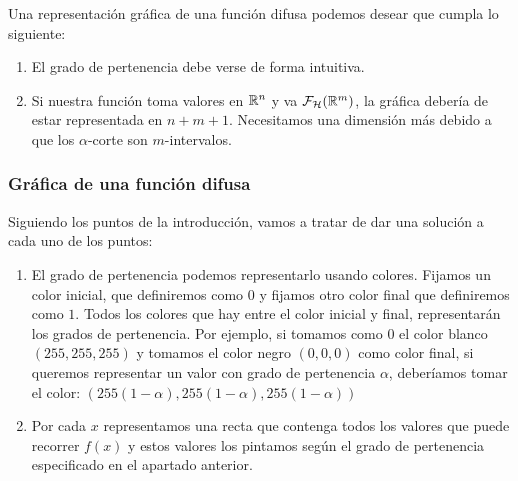   Una representación gráfica de una función difusa podemos desear que cumpla lo siguiente:
  \begin{enumerate}
  \item El grado de pertenencia debe verse de forma intuitiva.
  \item Si nuestra función toma valores en $\mathbb R^n$ y va $\mathcal{F}_\mathcal{H}(\mathbb R^m)$, la gráfica debería de estar representada en $n+m+1$. Necesitamos una dimensión más debido a que los $\alpha$-corte son $m$-intervalos.
  \end{enumerate}

  \subsubsection{Gráfica de una función difusa}

  Siguiendo los puntos de la introducción, vamos a tratar de dar una solución a cada uno de los puntos:

  \begin{enumerate}
  \item El grado de pertenencia podemos representarlo usando colores. Fijamos un color inicial, que definiremos como $0$ y fijamos otro color final que definiremos como $1$. Todos los colores que hay entre el color inicial y final, representarán los grados de pertenencia. Por ejemplo, si tomamos como $0$ el color blanco $(255, 255, 255)$ y tomamos el color negro $(0, 0, 0)$ como color final, si queremos representar un valor con grado de pertenencia $\alpha$, deberíamos tomar el color: $(255(1-\alpha), 255(1-\alpha), 255(1-\alpha))$
    
  \item Por cada $x$ representamos una recta que contenga todos los valores que puede recorrer $f(x)$ y estos valores los pintamos según el grado de pertenencia especificado en el apartado anterior.
  \end{enumerate}
  \fi

